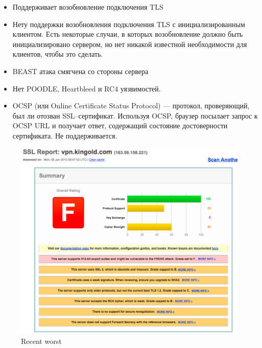 \documentclass[utf8x, 12pt]{G7-32}
\begin{document}
\begin{itemize}
	\item Поддерживает возобновление подключения TLS
	\item Нету поддержки возобновления подключения TLS с инициализированным клиентом. Есть некоторые случаи, в которых возобновление должно быть инициализировано сервером, но нет никакой известной необходимости для клиентов, чтобы это сделать.
	\item BEAST атака смягчена со стороны сервера
	\item Нет POODLE, Heartbleed и RC4 уязвимостей.
	\item OCSP (или Online Certificate Status Protocol) --- протокол, проверяющий, был ли отозван SSL--сертификат. Используя OCSP, браузер посылает запрос к OCSP URL и получает ответ, содержащий состояние достоверности сертификата. Не поддерживается.
\end{itemize}



\newpage

\begin{figure}[hhh!]
	\begin{center}
		\includegraphics[width=14cm]{img/weak}
	\end{center}
	\vspace{-5mm}\caption{Recent worst}
\end{figure}
\end{document}
